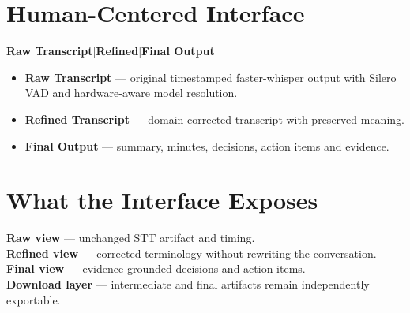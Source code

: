 \documentclass[9pt,a4paper]{extarticle}
\begin{document}
\begin{minipage}[t]{0.53\textwidth}
\section*{Human-Centered Interface}
\begin{card}
\centering\textbf{Raw Transcript}\hspace{8pt}|\hspace{8pt}\textbf{Refined}\hspace{8pt}|\hspace{8pt}\textbf{Final Output}
\end{card}
\begin{itemize}\setlength{\itemsep}{1pt}\setlength{\parskip}{0pt}
\item \textbf{Raw Transcript} — original timestamped faster-whisper output with Silero VAD and hardware-aware model resolution.
\item \textbf{Refined Transcript} — domain-corrected transcript with preserved meaning.
\item \textbf{Final Output} — summary, minutes, decisions, action items and evidence.
\end{itemize}
\section*{What the Interface Exposes}
\begin{card}
\small
\textbf{Raw view} — unchanged STT artifact and timing.\\
\textbf{Refined view} — corrected terminology without rewriting the conversation.\\
\textbf{Final view} — evidence-grounded decisions and action items.\\
\textbf{Download layer} — intermediate and final artifacts remain independently exportable.
\end{card}
\end{minipage}\hfill
\end{document}
